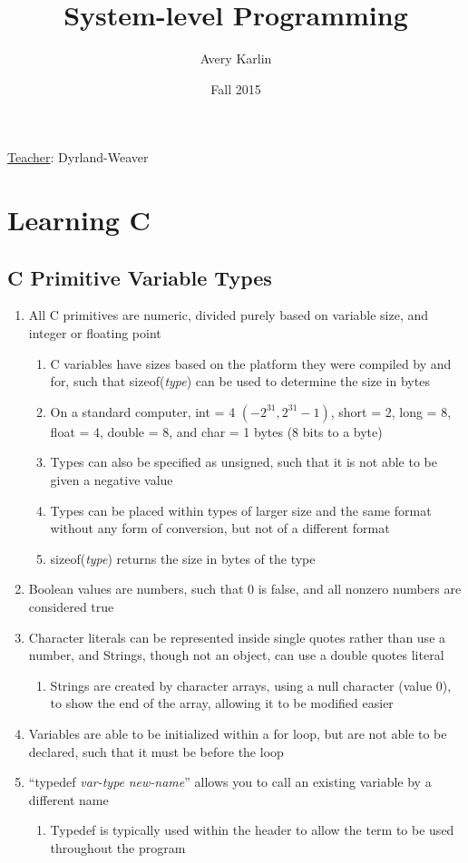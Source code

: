 \documentclass[11 pt, twoside]{article}
\begin{document}
\title{System-level Programming}
\author{Avery Karlin}
\date{Fall 2015}

\maketitle
\newpage
\tableofcontents
\vspace{11pt}
\noindent
\underline{Teacher}: Dyrland-Weaver
\newpage

\section{Learning C}
\subsection{C Primitive Variable Types}
\begin{enumerate}
\item All C primitives are numeric, divided purely based on variable size, and integer or floating point
\begin{enumerate}
\item C variables have sizes based on the platform they were compiled by and for, such that sizeof(\textit{type}) can be used to determine the size in bytes
\item On a standard computer, int = 4 $(-2^31, 2^31 - 1)$, short = 2, long = 8, float = 4, double = 8, and char = 1 bytes (8 bits to a byte)
\item Types can also be specified as unsigned, such that it is not able to be given a negative value
\item Types can be placed within types of larger size and the same format without any form of conversion, but not of a different format
\item sizeof(\textit{type}) returns the size in bytes of the type
\end{enumerate}
\item Boolean values are numbers, such that 0 is false, and all nonzero numbers are considered true
\item Character literals can be represented inside single quotes rather than use a number, and Strings, though not an object, can use a double quotes literal
\begin{enumerate}
\item Strings are created by character arrays, using a null character (value 0), to show the end of the array, allowing it to be modified easier
\end{enumerate}
\item Variables are able to be initialized within a for loop, but are not able to be declared, such that it must be before the loop
\item ``typedef \textit{var-type} \textit{new-name}'' allows you to call an existing variable by a different name
\begin{enumerate}
\item Typedef is typically used within the header to allow the term to be used throughout the program
\end{enumerate}
\end{enumerate}
\end{document}
